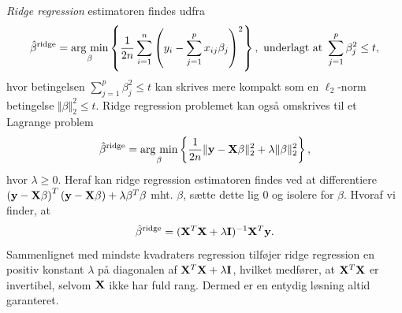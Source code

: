 \textit{Ridge regression} estimatoren findes udfra 
\begin{align} 
\hat{\beta}^\text{ridge} = \argmin_{\beta} \cbr{\frac{1}{2n} \sum_{i=1}^n \del{y_i - \sum_{j=1}^p x_{ij} \beta_j}^2}, \ \text{underlagt at } \sum_{j=1}^p \beta_j^2 \leq t, \label{eq:2.7} 
\end{align} 
hvor betingelsen $\sum_{j=1}^p \beta_j^2 \leq t$ kan skrives mere kompakt som en \(\ell_2\)-norm betingelse $\Vert \beta \Vert_2^2 \leq t$.
Ridge regression problemet kan også omskrives til et Lagrange problem
\begin{align*}
\hat{\beta}^\text{ridge} = \argmin_{\beta} \cbr{\frac{1}{2n} \Vert \y - \X \beta \Vert_2^2 + \lambda \Vert \beta \Vert_2^2},
\end{align*}
hvor $\lambda \geq 0$.
Heraf kan ridge regression estimatoren findes ved at differentiere \(\del{\y - \X \beta}^T \del{\y - \X \beta} + \lambda \beta^T \beta\) mht. $\beta$, sætte dette lig 0 og isolere for $\beta$. Hvoraf vi finder, at
\begin{align} 
\hat{\beta}^\text{ridge} = (\mathbf{X}^T \mathbf{X} + \lambda \mathbf{I})^{-1} \mathbf{X}^T \mathbf{y}. \label{eq:ridge_estimator}
\end{align}  
Sammenlignet med mindste kvadraters regression tilføjer ridge regression en positiv konstant $\lambda$ på diagonalen af $\mathbf{X}^T \mathbf{X} + \lambda \mathbf{I}$, hvilket medfører, at \(\mathbf{X}^T \mathbf{X}\) er invertibel, selvom $\mathbf{X}$ ikke har fuld rang. 
Dermed er en entydig løsning altid garanteret. 

